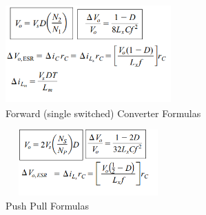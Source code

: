 \documentclass[twocolumn, ]{article}
\begin{document}
\begin{figure}[!ht]
	\includegraphics[width=2.5in,height=1.5in]{forwardsingleswitch.png}
	\caption{Forward (single switched) Converter Formulas}
\end{figure}
\begin{figure}[!ht]
	\includegraphics[width=2.5in,height=1in]{pushpull_someformulas.png}
	\caption{Push Pull Formulas}
\end{figure}
\end{document}
